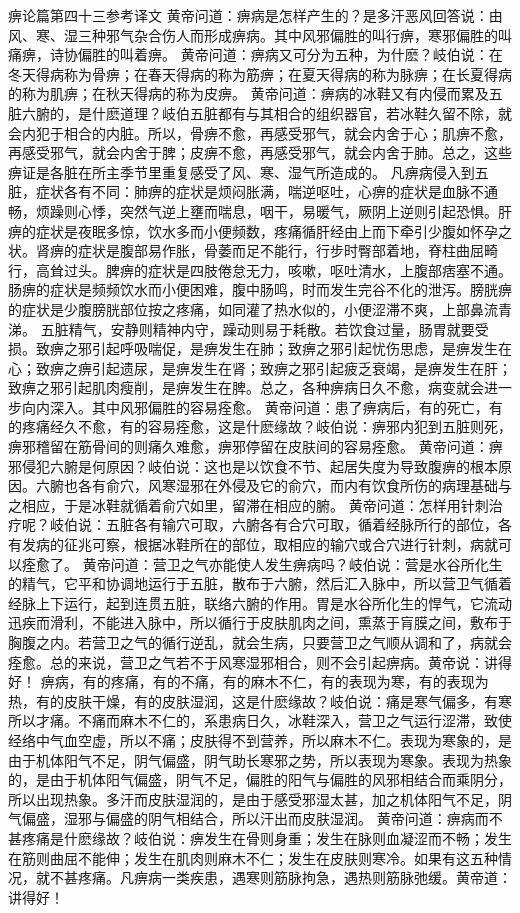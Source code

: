\documentclass[a4paper,12pt,UTF8,twoside]{ctexbook}
\begin{document}
痹论篇第四十三参考译文
黄帝问道：痹病是怎样产生的？是多汗恶风回答说：由风、寒、湿三种邪气杂合伤人而形成痹病。其中风邪偏胜的叫行痹，寒邪偏胜的叫痛痹，诗协偏胜的叫着痹。
黄帝问道：痹病又可分为五种，为什麽？岐伯说：在冬天得病称为骨痹；在春天得病的称为筋痹；在夏天得病的称为脉痹；在长夏得病的称为肌痹；在秋天得病的称为皮痹。
黄帝问道：痹病的冰鞋又有内侵而累及五脏六腑的，是什麽道理？岐伯五脏都有与其相合的组织器官，若冰鞋久留不除，就会内犯于相合的内脏。所以，骨痹不愈，再感受邪气，就会内舍于心；肌痹不愈，再感受邪气，就会内舍于脾；皮痹不愈，再感受邪气，就会内舍于肺。总之，这些痹证是各脏在所主季节里重复感受了风、寒、湿气所造成的。
凡痹病侵入到五脏，症状各有不同：肺痹的症状是烦闷胀满，喘逆呕吐，心痹的症状是血脉不通畅，烦躁则心悸，突然气逆上壅而喘息，咽干，易暖气，厥阴上逆则引起恐惧。肝痹的症状是夜眠多惊，饮水多而小便频数，疼痛循肝经由上而下牵引少腹如怀孕之状。肾痹的症状是腹部易作胀，骨萎而足不能行，行步时臀部着地，脊柱曲屈畸行，高耸过头。脾痹的症状是四肢倦怠无力，咳嗽，呕吐清水，上腹部痞塞不通。肠痹的症状是频频饮水而小便困难，腹中肠鸣，时而发生完谷不化的泄泻。膀胱痹的症状是少腹膀胱部位按之疼痛，如同灌了热水似的，小便涩滞不爽，上部鼻流青涕。
五脏精气，安静则精神内守，躁动则易于耗散。若饮食过量，肠胃就要受损。致痹之邪引起呼吸喘促，是痹发生在肺；致痹之邪引起忧伤思虑，是痹发生在心；致痹之痹引起遗尿，是痹发生在肾；致痹之邪引起疲乏衰竭，是痹发生在肝；致痹之邪引起肌肉瘦削，是痹发生在脾。总之，各种痹病日久不愈，病变就会进一步向内深入。其中风邪偏胜的容易痊愈。
黄帝问道：患了痹病后，有的死亡，有的疼痛经久不愈，有的容易痊愈，这是什麽缘故？岐伯说：痹邪内犯到五脏则死，痹邪稽留在筋骨间的则痛久难愈，痹邪停留在皮肤间的容易痊愈。
黄帝问道：痹邪侵犯六腑是何原因？岐伯说：这也是以饮食不节、起居失度为导致腹痹的根本原因。六腑也各有俞穴，风寒湿邪在外侵及它的俞穴，而内有饮食所伤的病理基础与之相应，于是冰鞋就循着俞穴如里，留滞在相应的腑。
黄帝问道：怎样用针刺治疗呢？岐伯说：五脏各有输穴可取，六腑各有合穴可取，循着经脉所行的部位，各有发病的征兆可察，根据冰鞋所在的部位，取相应的输穴或合穴进行针刺，病就可以痊愈了。
黄帝问道：营卫之气亦能使人发生痹病吗？岐伯说：营是水谷所化生的精气，它平和协调地运行于五脏，散布于六腑，然后汇入脉中，所以营卫气循着经脉上下运行，起到连贯五脏，联络六腑的作用。胃是水谷所化生的悍气，它流动迅疾而滑利，不能进入脉中，所以循行于皮肤肌肉之间，熏蒸于肓膜之间，敷布于胸腹之内。若营卫之气的循行逆乱，就会生病，只要营卫之气顺从调和了，病就会痊愈。总的来说，营卫之气若不于风寒湿邪相合，则不会引起痹病。黄帝说：讲得好！
痹病，有的疼痛，有的不痛，有的麻木不仁，有的表现为寒，有的表现为热，有的皮肤干燥，有的皮肤湿润，这是什麽缘故？岐伯说：痛是寒气偏多，有寒所以才痛。不痛而麻木不仁的，系患病日久，冰鞋深入，营卫之气运行涩滞，致使经络中气血空虚，所以不痛；皮肤得不到营养，所以麻木不仁。表现为寒象的，是由于机体阳气不足，阴气偏盛，阴气助长寒邪之势，所以表现为寒象。表现为热象的，是由于机体阳气偏盛，阴气不足，偏胜的阳气与偏胜的风邪相结合而乘阴分，所以出现热象。多汗而皮肤湿润的，是由于感受邪湿太甚，加之机体阳气不足，阴气偏盛，湿邪与偏盛的阴气相结合，所以汗出而皮肤湿润。
黄帝问道：痹病而不甚疼痛是什麽缘故？岐伯说：痹发生在骨则身重；发生在脉则血凝涩而不畅；发生在筋则曲屈不能伸；发生在肌肉则麻木不仁；发生在皮肤则寒冷。如果有这五种情况，就不甚疼痛。凡痹病一类疾患，遇寒则筋脉拘急，遇热则筋脉弛缓。黄帝道：讲得好！
\end{document}
